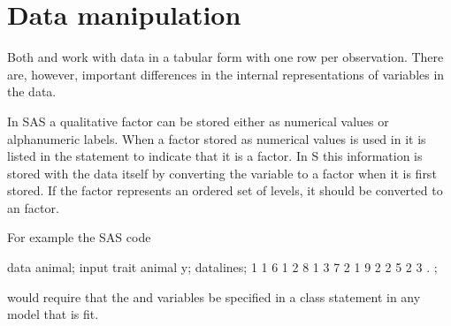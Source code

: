 \documentclass[12pt]{article}
\newcommand{\s}{\textsf{S}}
\begin{document}
\section{Data manipulation}
\label{sec:data}

Both  and  work with data in a tabular form
with one row per observation.  There are, however, important
differences in the internal representations of variables in the data.

In \textsf{SAS} a qualitative factor can be stored either as numerical
values or alphanumeric labels.  When a factor stored as numerical
values is used in  it is listed in the 
statement to indicate that it is a factor.  In \s{} this information
is stored with the data itself by converting the variable to a factor
when it is first stored.  If the factor represents an ordered set of
levels, it should be converted to an  factor.

For example the SAS code
\begin{Example}
data animal;
 input trait animal y;
 datalines;
1 1 6
1 2 8
1 3 7
2 1 9
2 2 5
2 3 .
;
\end{Example}
would require that the  and  variables be
specified in a class statement in any model that is fit.
\end{document}
